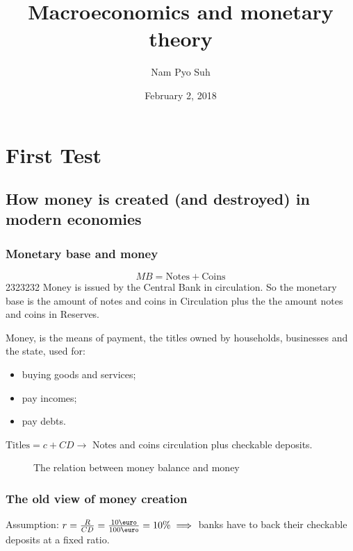 \documentclass{report}
\title{Macroeconomics and monetary theory}
\author{Nam Pyo Suh}
\date{February 2, 2018}
\begin{document}
\part{First Test}
\chapter{How money is created (and destroyed) in modern economies}
\section{Monetary base and money}

$$MB=\text{Notes} + \text{Coins}$$ 2323232 Money is issued by the Central Bank in circulation. So the monetary base is the amount of notes and coins in Circulation plus the the amount notes and coins in Reserves. 

Money, is the means of payment, the titles owned by households, businesses and the state, used for:
\begin{itemize}
    \item buying goods and services; 
    \item pay incomes; 
    \item pay debts.
\end{itemize}

$\text{Titles}=c+CD \longrightarrow $ Notes and coins circulation plus checkable deposits.

\begin{figure}[H]
    \centering
{}
    \caption{The relation between money balance and money}
    \label{fig:my_label}
\end{figure}

\clearpage
\section{The old view of money creation}

Assumption: $r=\frac{R}{CD}=\frac{10\text{\euro}}{100\text{\euro}}=10\% \implies$ banks have to back their checkable deposits at a fixed ratio.
\end{document}
